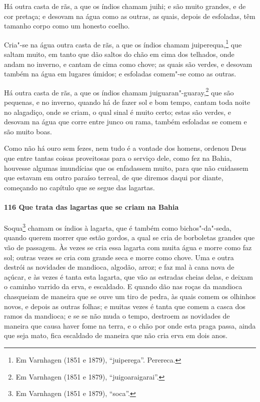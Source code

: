 Há outra casta de rãs, a que os índios chamam juihi; e são muito grandes, e de cor
pretaça; e desovam na água como as outras, as quais, depois de esfoladas, têm tamanho
corpo como um honesto coelho.

Cria"-se na água outra casta de rãs, a que os índios chamam juiperequa,\footnote{ Em
Varnhagen (1851 e 1879), ``juiperega''. Perereca.} que saltam muito, em tanto que dão
saltos do chão em cima dos telhados, onde andam no inverno, e cantam de cima como chove;
as quais são verdes, e desovam também na água em lugares úmidos; e esfoladas comem"-se como
as outras.

Há outra casta de rãs, a que os índios chamam juiguaran"-guaray,\footnote{ Em Varnhagen
(1851 e 1879), ``juigoaraigarai''.} que são pequenas, e no inverno, quando há de fazer
sol e bom tempo, cantam toda noite no alagadiço, onde se criam, o qual sinal é muito
certo; estas são verdes, e desovam na água que corre entre junco ou rama, também esfoladas
se comem e são muito boas.

Como não há ouro sem fezes, nem tudo é a vontade dos homens, ordenou Deus que entre tantas
coisas proveitosas para o serviço dele, como fez na Bahia, houvesse algumas imundícias que
os enfadassem muito, para que não cuidassem que estavam em outro paraíso terreal, de que
diremos daqui por diante, começando no capítulo que se segue das lagartas.

\paragraph{116 Que trata das lagartas que se criam na Bahia}

Soqua\footnote{ Em Varnhagen (1851 e 1879), ``soca''.} chamam os índios à lagarta, que é
também como bichos"-da"-seda, quando querem morrer que estão gordos, a qual se cria de
borboletas grandes que vão de passagem. Às vezes se cria essa lagarta com muita água e
morre como faz sol; outras vezes se cria com grande seca e morre como chove. Uma e outra
destrói as novidades de mandioca, algodão, arroz; e faz mal à cana nova de açúcar, e às
vezes é tanta esta lagarta, que vão as estradas cheias delas, e deixam o caminho varrido
da erva, e escaldado. E quando dão nas roças da mandioca chasqueiam de maneira que se ouve
um tiro de pedra, às quais comem os olhinhos novos, e depois as outras folhas; e muitas
vezes é tanta que comem a casca dos ramos da mandioca; e se se não muda o tempo, destroem
as novidades de maneira que causa haver fome na terra, e o chão por onde esta praga passa,
ainda que seja mato, fica escaldado de maneira que não cria erva em dois anos.

